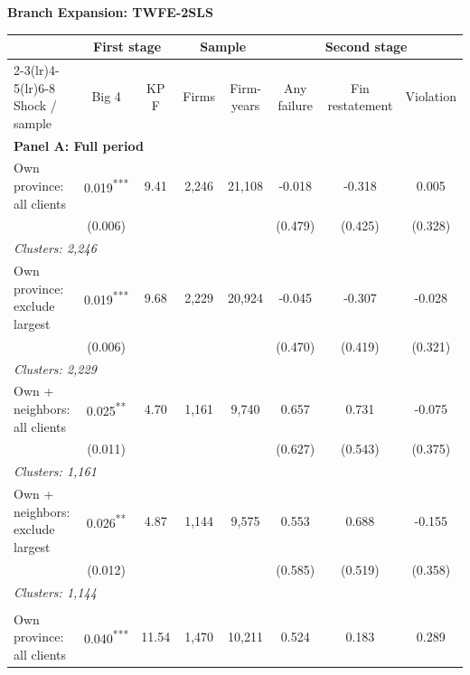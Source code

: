 \documentclass[10pt]{article}
\newcommand{\sym}[1]{\textsuperscript{#1}}
\begin{document}
\begin{minipage}{23.60cm}
\fontsize{10}{12}\selectfont
\setlength{\tabcolsep}{4pt}\renewcommand{\arraystretch}{1.08}
{\large\bfseries Branch Expansion: TWFE-2SLS}\par\medskip
\begin{tabular*}{\linewidth}{@{\extracolsep{\fill}}lccccccc@{}}
\toprule
 & \multicolumn{2}{c}{First stage} & \multicolumn{2}{c}{Sample} & \multicolumn{3}{c}{Second stage} \\
\cmidrule(lr){2-3}\cmidrule(lr){4-5}\cmidrule(lr){6-8}
Shock / sample & Big 4 & KP F & Firms & Firm-years & Any failure & Fin restatement & Violation \\
\midrule
\multicolumn{8}{l}{\textbf{Panel A: Full period}} \\
\addlinespace[3pt]
Own province: all clients & 0.019\sym{***} & 9.41 & 2,246 & 21,108 & -0.018 & -0.318 & 0.005 \\
 & (0.006) &  &  &  & (0.479) & (0.425) & (0.328) \\
\multicolumn{8}{l}{\hspace{1em}\textit{Clusters: 2,246}} \\
\addlinespace[3pt]
Own province: exclude largest & 0.019\sym{***} & 9.68 & 2,229 & 20,924 & -0.045 & -0.307 & -0.028 \\
 & (0.006) &  &  &  & (0.470) & (0.419) & (0.321) \\
\multicolumn{8}{l}{\hspace{1em}\textit{Clusters: 2,229}} \\
\addlinespace[3pt]
Own + neighbors: all clients & 0.025\sym{**} & 4.70 & 1,161 & 9,740 & 0.657 & 0.731 & -0.075 \\
 & (0.011) &  &  &  & (0.627) & (0.543) & (0.375) \\
\multicolumn{8}{l}{\hspace{1em}\textit{Clusters: 1,161}} \\
\addlinespace[3pt]
Own + neighbors: exclude largest & 0.026\sym{**} & 4.87 & 1,144 & 9,575 & 0.553 & 0.688 & -0.155 \\
 & (0.012) &  &  &  & (0.585) & (0.519) & (0.358) \\
\multicolumn{8}{l}{\hspace{1em}\textit{Clusters: 1,144}} \\
\addlinespace[3pt]
\midrule
\multicolumn{8}{l}{\textbf{Panel B: Through 2012}} \\
\addlinespace[3pt]
Own province: all clients & 0.040\sym{***} & 11.54 & 1,470 & 10,211 & 0.524 & 0.183 & 0.289 \\

\end{tabular*}
\end{minipage}
\end{document}
